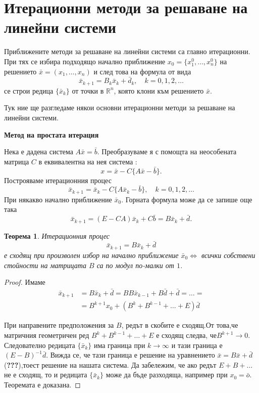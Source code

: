 \documentclass[12pt]{article}
\numberwithin{equation}{section}
\newtheorem{theorem}{Теорема}
\numberwithin{theorem}{section}
\numberwithin{definition}{section}
\numberwithin{corollary}{section}
\begin{document}
\section{Итерационни методи за решаване на линейни системи}
\par
Приближените методи за решаване на линейни системи са главно итерационни. При тях се избира подходящо начално приближение $x_0 = \{x_1^0,\dotso, x_n^0\}$ на решението $\bar{x} = (x_1, \dotso, x_n)$ и след това на формула от вида
\[
\bar{x}_{k+1} = B_k\bar{x}_k+\bar{d}_k,\hspace{12pt}k=0,1,2,\dotso
\]
се строи редица $\{\bar{x}_k\}$ от точки в $\mathbb{R}^n$, която клони към решението $\bar{x}$.
\par
Тук ние ще разгледаме някои основни итерационни методи за решаване на линейни системи.
\begin{center}
\textbf{Метод на простата итерация}
\end{center}
\par
Нека е дадена система $A\bar{x}=\bar{b}$. Преобразуваме я с помощта на неособената матрица $C$ в еквивалентна на нея система :
\[
x = \bar{x}-C\{A\bar{x} - \bar{b}\}.
\]
Построяваме итерационния процес
\[
\bar{x}_{k+1} = \bar{x}_k-C\{A\bar{x}_k-\bar{b}\},\hspace{12pt} k = 0,1,2,\dotso
\]
При някакво начално приближение $\bar{x}_0$. Горната формула може да се запише още така
\[
\bar{x}_{k+1}=(E-CA)\bar{x}_k +C\bar{b}=B\bar{x}_k+\bar{d}.
\]
\begin{theorem}\label{th5.1}
Итерационния процес
\[
\bar{x}_{k+1}=B\bar{x}_k+\bar{d}
\]
е сходящ при произволен избор на начално приближение $\bar{x}_0\iff$ всички собствени стойности на матрицата $B$ са по модул по-малки от $1$.
\end{theorem}
\begin{proof}
Имаме
\begin{align*}
\bar{x}_{k+1}&=B\bar{x}_k + \bar{d}=BB\bar{x}_{k-1}+B\bar{d}+\bar{d}=\dotso=\\
&=B^{k+1}x_0+(B^k+B^{k-1}+\dotso+E)\bar{d}
\end{align*}
\par
При направените предположения за $B$, редът в скобите е сходящ.От това,че матричния геометричен ред $B^k+B^{k-1}+\dotso+E$ е сходящ следва, че$B^{k+1}\rightarrow 0$. Следователно редицата $\{\bar{x}_k\}$ има граница при $k\rightarrow\infty$ и тази граница е $(E-B)^{-1}\bar{d}$. Вижда се, че тази граница е решение на уравнението $\bar{x}=B\bar{x}+\bar{d}$(\textbf{???}),тоест решение на нашата система. Да забележим, че ако редът $E+B+\dotso$ не е сходящ, то и редицата $\{\bar{x}_k\}$ може да бъде разходяща, например при $x_0=\bar{o}$. Теоремата е доказана.
\end{proof}
\end{document}
